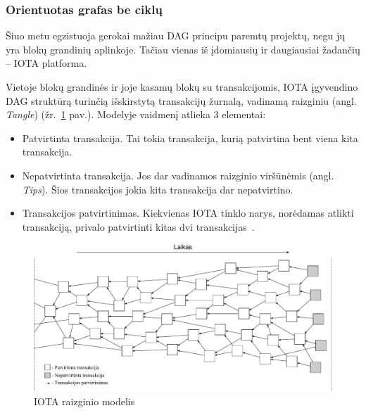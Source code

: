 
\subsubsection{Orientuotas grafas be ciklų} \label{subsection:dag}

Šiuo metu egzistuoja gerokai mažiau DAG principu paremtų projektų, negu jų yra blokų grandinių aplinkoje. Tačiau vienas iš įdomiausių ir daugiausiai žadančių – IOTA platforma. 




 \label{subsection:dag-principals}

Vietoje blokų grandinės ir joje kasamų blokų su transakcijomis, IOTA įgyvendino DAG struktūrą turinčią išskirstytą transakcijų žurnalą, vadinamą raizginiu (angl. \textit{Tangle}) (žr.~\ref{img:8} pav.). Modelyje vaidmenį atlieka 3 elementai:
\begin{itemize}
    \item Patvirtinta transakcija. Tai tokia transakcija, kurią patvirtina bent viena kita transakcija.
    \item Nepatvirtinta transakcija. Jos dar vadinamos raizginio viršūnėmis (angl. \textit{Tips}). Šios transakcijos jokia kita transakcija dar nepatvirtino.
    \item Transakcijos patvirtinimas. Kiekvienas IOTA tinklo narys, norėdamas atlikti transakciją, privalo patvirtinti kitas dvi transakcijas~\cite{popov2016tangle}.
\end{itemize} 

\begin{figure}[H]
    \centering
    \includegraphics[scale=0.56]{images/iota-tangle}
    \caption{IOTA raizginio modelis~\cite{popov2016tangle}}
    \label{img:8}
\end{figure}

